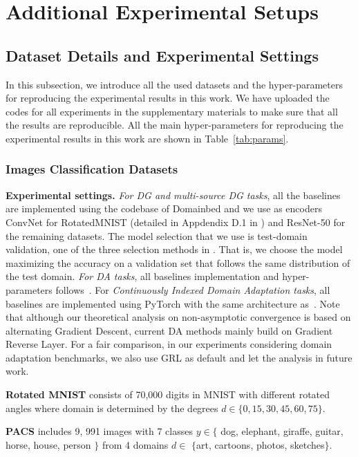\documentclass{article} \usepackage{iclr2023_conference,times}
\begin{document}
\section{Additional Experimental Setups}\label{sec:exp_detail}
\subsection{Dataset Details and Experimental Settings}\label{sec:data_detail}
In this subsection, we introduce all the used datasets and the hyper-parameters for reproducing the experimental results in this work. We have uploaded the codes for all experiments in the supplementary materials to make sure that all the results are reproducible. All the main hyper-parameters for reproducing the experimental results in this work are shown in Table~\ref{tab:params}.
\subsubsection{Images Classification Datasets}\label{sec:data_detail_cls}
\textbf{Experimental settings.} \textit{For DG and multi-source DG tasks}, all the baselines are implemented using the codebase of Domainbed \citep{gulrajani2021in} and we use as encoders ConvNet for RotatedMNIST (detailed in Appdendix D.1 in \citep{gulrajani2021in}) and ResNet-50 for the remaining datasets. The model selection that we use is test-domain validation, one of the three selection methods in \citep{gulrajani2021in}. That is, we choose the model maximizing the accuracy on a validation set that follows the same distribution of the test domain. \textit{For DA tasks}, all baselines implementation and hyper-parameters follows~\citep{deepda}. For \textit{Continuously Indexed Domain Adaptation tasks}, all baselines are implemented using PyTorch with the same architecture as~\citep{wang2020continuously}. Note that although our theoretical analysis on non-asymptotic convergence is based on alternating Gradient Descent, current DA methods mainly build on Gradient Reverse Layer. For a fair comparison, in our experiments considering domain adaptation benchmarks, we also use GRL as default and let the analysis in future work.


\noindent\textbf{Rotated MNIST} \citep{ghifary2015domain} consists of 70,000 digits in MNIST with different rotated angles where domain is determined by the degrees $d \in \{0, 15, 30, 45,
60, 75\}$.

\noindent\textbf{PACS} \citep{li2017deeper} includes 9, 991 images with 7 classes $y \in  \{$ dog, elephant, giraffe, guitar, horse, house, person $\}$ from 4 domains $d \in$ $\{$art, cartoons, photos, sketches$\}$. 
\end{document}

